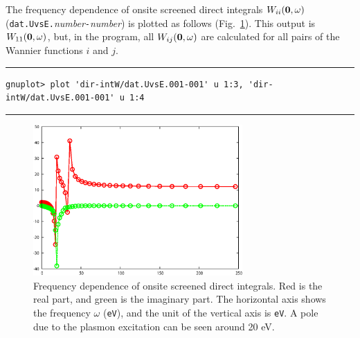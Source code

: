 \documentclass{article}
\begin{document}
The frequency dependence of onsite screened direct integrals $W_{ii}({\bf 0},\omega)$ ({\tt dat.UvsE.}{\it number}{\tt -}{\it number}) is plotted as follows (Fig.~\ref{UvsE}). This output is $W_{11}({\bf 0},\omega)$, but, in the program, all $W_{ij}({\bf 0},\omega)$ are calculated for all pairs of the Wannier functions $i$ and $j$. 
\vspace{3mm}\hrule
\begin{verbatim}
gnuplot> plot 'dir-intW/dat.UvsE.001-001' u 1:3, 'dir-intW/dat.UvsE.001-001' u 1:4  
\end{verbatim}
\hrule\vspace{3mm}
\begin{figure}[H] 
\centering
\includegraphics[width=8cm]{UvsE-Al.eps}
\caption{Frequency dependence of onsite screened direct integrals. Red is the real part, and green is the imaginary part. The horizontal axis shows the frequency $\omega$ ({\tt eV}), and the unit of the vertical axis is {\tt eV}. A pole due to the plasmon excitation can be seen around 20 eV.}
\label{UvsE}
\end{figure}
\end{document}
